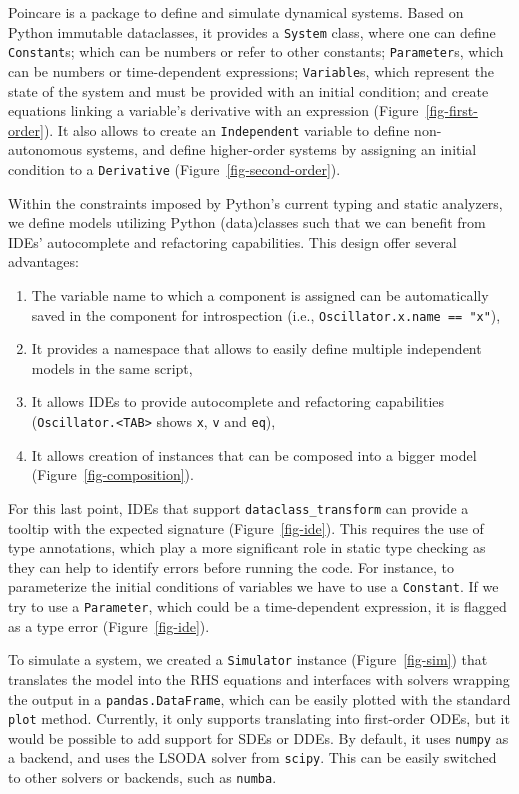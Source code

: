 \documentclass[namedate,numsec,webpdf,modern,large]{oup-authoring-template}
\theoremstyle{thmstyleone}%
\theoremstyle{thmstyletwo}%
\theoremstyle{thmstylethree}%
\begin{document}
Poincare is a package to define and simulate dynamical systems.
Based on Python immutable dataclasses,
it provides a \texttt{System} class,
where one can define
\texttt{Constant}s; which can be numbers or refer to other constants;
\texttt{Parameter}s, which can be numbers or time-dependent expressions;
\texttt{Variable}s, which represent the state of the system and must be provided with an initial condition;
and create equations linking a variable's derivative with an expression (Figure~\ref{fig-first-order}).
It also allows to
create an \texttt{Independent} variable to define non-autonomous systems,
and define higher-order systems by assigning an initial condition to a \texttt{Derivative} (Figure~\ref{fig-second-order}).

Within the constraints imposed by Python's current typing and static analyzers,
we define models utilizing Python (data)classes
such that we can benefit from \acp{IDE}' autocomplete and refactoring capabilities.
This design offer several advantages:

\begin{enumerate}
\item
  The variable name to which a component is assigned can be automatically saved in the component for introspection
  (i.e., \texttt{Oscillator.x.name\ ==\ "x"}),
\item
  It provides a namespace that allows to easily define multiple independent models in the same script,
\item
  It allows \acp{IDE} to provide autocomplete and refactoring capabilities
  (\texttt{Oscillator.\textless{}TAB\textgreater{}} shows \texttt{x}, \texttt{v} and \texttt{eq}),
\item
  It allows creation of instances that can be composed into a bigger model (Figure~\ref{fig-composition}).
\end{enumerate}

For this last point,
\acp{IDE} that support \texttt{dataclass\_transform} \citep{debontePEP681Data2021}
can provide a tooltip with the expected signature (Figure~\ref{fig-ide}).
This requires the use of type annotations,
which play a more significant role in static type checking
as they can help to identify errors before running the code.
For instance, to parameterize the initial conditions of variables
we have to use a \texttt{Constant}.
If we try to use a \texttt{Parameter},
which could be a time-dependent expression,
it is flagged as a type error (Figure~\ref{fig-ide}).

To simulate a system,
we created a \texttt{Simulator} instance (Figure~\ref{fig-sim})
that translates the model into the \ac{RHS} equations
and interfaces with solvers
wrapping the output in a \texttt{pandas.DataFrame},
which can be easily plotted with the standard \texttt{plot} method.
Currently,
it only supports translating into first-order \acp{ODE},
but it would be possible to add support for \acp{SDE} or \acp{DDE}.
By default,
it uses \texttt{numpy} as a backend,
and uses the LSODA solver from \texttt{scipy}.
This can be easily switched to other solvers or backends, such as \texttt{numba}.
\end{document}
